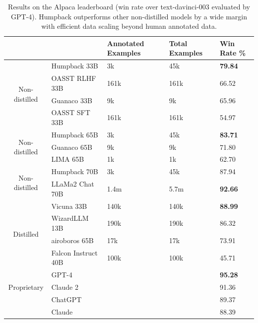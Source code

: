 \begin{table}[t]
    \caption{
    Results on the Alpaca leaderboard (win rate over text-davinci-003 evaluated by GPT-4). Humpback outperforms other non-distilled models by a wide margin with efficient data scaling beyond human annotated data. 
  \label{tab:alpaca_leaderb}
    }
    \small
  \centering
  \begin{tabular}{cllll}
    \toprule
     &   & \textbf{Annotated Examples} & \textbf{Total Examples} & \textbf{Win Rate \%}  \\
    
    \midrule  
  
   \multirow{4}{4em}{Non-distilled} & Humpback 33B & 3k & 45k & \textbf{79.84} \\

     & OASST RLHF 33B & 161k & 161k & 66.52 \\
     & Guanaco 33B & 9k & 9k & 65.96 \\
    & OASST SFT 33B & 161k & 161k & 54.97 \\
     \midrule
      \multirow{3}{4em}{Non-distilled} & Humpback 65B & 3k & 45k & \bf{83.71} \\
   & Guanaco 65B & 9k & 9k & 71.80 \\
    & LIMA 65B & 1k & 1k & 62.70  \\
     \midrule  
     \multirow{2}{4em}{Non-distilled} & Humpback 70B & 3k & 45k & 87.94 \\
   & LLaMa2 Chat 70B & 1.4m & 5.7m & \bf{92.66} \\
   \midrule
   \multirow{4}{4em}{Distilled}  & Vicuna 33B & 140k & 140k & \bf{88.99} \\
    & WizardLLM 13B & 190k & 190k & 86.32 \\
    & airoboros 65B & 17k & 17k & 73.91 \\
     & Falcon Instruct 40B & 100k & 100k & 45.71 \\
   
     \midrule
  \multirow{3}{4em}{Proprietary} & GPT-4 & & & \bf{95.28} \\
   & Claude 2 & & & 91.36 \\
   & ChatGPT & &  & 89.37 \\ %
   & Claude & & & 88.39 \\
    \bottomrule
  \end{tabular}
\end{table}


